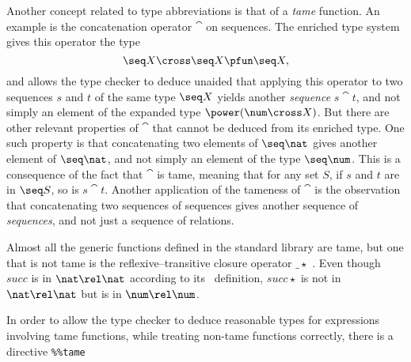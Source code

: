 {{{Another concept related to type abbreviations is that of a {\em
tame\/} function.  An example is the
concatenation operator $\cat$%
 on sequences.  The
enriched type 
system gives this operator the type
\[ \seq X \cross \seq X \pfun \seq X, \] 
and allows the type checker to deduce unaided that applying this
operator to two sequences $s$ and $t$ of the same type $\seq X$
yields another {\em sequence\/} $s \cat t$, and not simply an
element of the expanded type $\power(\num \cross X)$.  But there
are other relevant properties of $\cat$ that cannot be deduced from
its enriched type.  One such property is that concatenating two elements of
$\seq \nat$ gives another element of $\seq \nat$, and not simply an
element of the type $\seq \num$.  This is a consequence of the fact
that $\cat$ is tame, meaning that for any set $S$, if $s$ and $t$
are in $\seq S$, so is $s \cat t$.  Another application of the
tameness of $\cat$ is the observation that concatenating two
sequences of sequences gives another sequence of {\em sequences},
and not just a sequence of relations.

Almost all the generic functions defined in the standard library are
tame, but one that is not tame is the reflexive--transitive
closure operator $\_\star$%
.
Even though $succ$ is in $\nat \rel 
\nat$ according to its \ZRM\ definition, $succ\star$ is not in $\nat
\rel \nat$ but is in $\num \rel \num$.

In order to allow the type checker to deduce reasonable types for
expressions involving tame functions, while treating non-tame
functions correctly, there is a directive
\verb/%%tame/\index{|%
generic function is tame for the types with which it was declared
(for details, see Section~\ref{directives}).  Like the \verb/%%type/
directive, it is used extensively in the standard prelude, but is
less commonly used in ordinary specification documents.  In checking
a function application, the type checker treats it as a special case
if the function being applied is known to be tame.  If the function
being applied is not a generic function symbol with implicit
parameters that has been announced as tame, the type checker uses a
more conservative method of calculating the type.%
\index{type abbreviations-}\index{tame functions-}

\section{Invisible and unchecked paragraphs}\label{unchecked}

}}}}
